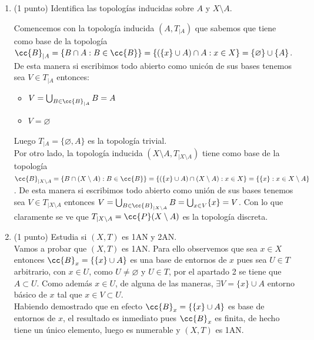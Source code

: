 \documentclass[12pt]{article}
\begin{document}
\begin{ejercicio}
\begin{enumerate}
        \begin{itemize}
            \item[$\Rightarrow$] Supongamos que $U \in T$, entonces $U = \bigcup_{B_i\in \cc{B}} B_i = \bigcup_{i\in I} (\{x_i\} \cup A) = (\bigcup_{i\in I} \{x_i\}) \cup A$, por lo que, $A \subset U$.
            \item[$\Leftarrow$] Supongamos que $A \subset U$, entonces para todo $a \in A$ existe un $B_a = \{a\} \cup A = A$ con $a\in B_a\subset A\subset U$ luego $U\in \cc{N}_a, \forall a \in A$. Por otro lado si $b\in U\setminus A$ existe un $B_b = \{b\} \cup A$ con $b\in B_b\subset U$ y por lo tanto $U \in \cc{N}_b$. Luego $U\in \cc{N}_x, \forall x \in U$ lo que implica que $U \in T$.
        \end{itemize}
        \item (1 punto) Identifica las topologías inducidas sobre $A$ y $X \setminus A$.
        
        Comencemos con la topología inducida $(A, T_{|A})$ que sabemos que tiene como base de la topología $\cc{B}_{|A} = \{B\cap A : B \in \cc{B}\} = \{(\{x\} \cup A)\cap A : x\in X\} = \{\varnothing\} \cup\{A\}$. De esta manera si escribimos todo abierto como unicón de sus bases tenemos sea $V\in T_{|A}$ entonces: 
        \begin{itemize}
            \item $V = \bigcup_{B\in\cc{B}_{|A}} B = A$
            \item $V = \varnothing$
        \end{itemize}
        Luego $T_{|A} = \{\varnothing, A\}$ es la topología trivial.\\

        Por otro lado, la topología inducida $(X\setminus A, T_{|X\setminus A})$ tiene como base de la topología $\cc{B}_{|X\setminus A} = \{B\cap (X\setminus A) : B \in \cc{B}\} = \{(\{x\} \cup A)\cap (X\setminus A) : x\in X\} = \{\{x\} : x\in X\setminus A\}$. De esta manera si escribimos todo abierto como unión de sus bases tenemos sea $V\in T_{|X\setminus A}$ entonces $V = \bigcup_{B\in\cc{B}_{|X\setminus A}} B = \bigcup_{x\in V} \{x\} = V$. Con lo que claramente se ve que $T_{|X\setminus A} = \cc{P}(X\setminus A)$ es la topología discreta.
        
        \item (1 punto) Estudia si $(X, T)$ es 1AN y 2AN.\\
        Vamos a probar que $(X, T)$ es 1AN. Para ello observemos que sea $x\in X$ entonces $\cc{B}_x=\{\{x\}\cup A\}$ es una base de entornos de $x$ pues sea $U\in T$ arbitrario, con $x\in U$, como $U \neq \varnothing$ y $U \in T$, por el apartado 2 se tiene que $A \subset U$. Como además $x \in U$, de alguna de las maneras, $\exists V = \{x\} \cup A$ entorno básico de $x$ tal que $x\in V\subset U$.\\
        Habiendo demostrado que en efecto $\cc{B}_x=\{\{x\}\cup A\}$ es base de entornos de $x$, el resultado es inmediato pues $\cc{B}_x$ es finita, de hecho tiene un único elemento, luego es numerable y $(X, T)$ es 1AN.\\
        

\end{enumerate}
\end{ejercicio}
\end{document}

